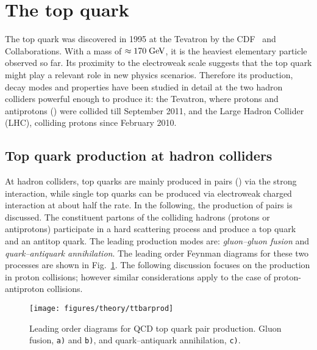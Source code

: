 \section{The top quark}
\label{sec:topquark}

The top quark was discovered in 1995 at the Tevatron by the
CDF~\cite{topcdf} and \dzero{}~\cite{topdzero} Collaborations. With a
mass of $\approx{}170\; \mathrm{GeV}{}$, it is the heaviest elementary particle
observed so far. Its proximity to the electroweak scale suggests that
the top quark might play a relevant role in new physics
scenarios. Therefore its production, decay modes and properties have
been studied in detail at the two hadron colliders powerful 
enough to produce it: the Tevatron, where protons and antiprotons (\ppbar{}) were
collided till September 2011, and the Large Hadron Collider (LHC),
colliding protons since February 2010.

\subsection{Top quark production at hadron colliders}
\label{sec:topprod}

At hadron colliders, top quarks are mainly produced in pairs
(\ttbar{}) via the strong interaction, while single top quarks can be
produced via electroweak charged interaction at about half the
rate. In the following, the production of \ttbar{} pairs is discussed.
The constituent partons of the
colliding hadrons (protons or antiprotons) participate in a hard
scattering process and produce a top quark and an antitop quark. The
leading production modes are: {\it gluon--gluon fusion} and {\it
  quark--antiquark annihilation}. The leading order Feynman diagrams
for these two processes are shown in Fig.~\ref{fig:ttbarprod}. The
following discussion focuses on the \ttbar{} production in proton
collisions; however similar considerations apply to the case of
proton-antiproton collisions.

\begin{figure}[!htb]\centering
  \texttt{[image: figures/theory/ttbarprod]}
  \caption{Leading order diagrams for QCD top quark pair production.
    Gluon fusion, {\tt a)} and {\tt b)}, and  quark--antiquark
    annihilation, {\tt c)}.}
  \label{fig:ttbarprod}
\end{figure}

